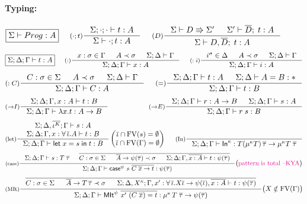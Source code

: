 \begin{figure}
\begin{framed}
\paragraph{Typing:}
\[ \fbox{$\Sigma |- Prog : A$}
 ~~~~
   \inference[($\cdot;t$)]{\Sigma;\cdot;\cdot |- t:A}
                          {\Sigma |- \cdot;t : A}
 ~~~~
   \inference[($D$)]{ \Sigma |- D \Rrightarrow \Sigma'
                    & \Sigma' |- \overline{D};\; t : A}
                    {\Sigma |- D,\overline{D};\; t : A}
\]
\[ \fbox{$\Sigma;\Delta;\Gamma |- t : A$}
 ~~~~
   \inference[($:$)]
      {x:\sigma \in \Gamma & A\prec\sigma & \Sigma;\Delta |- \Gamma} 
      {\Sigma;\Delta;\Gamma |- x:A}
 ~~~~
   \inference[($:i$)]
      {i^\sigma \in \Delta & A\prec\sigma & \Sigma;\Delta |- \Gamma} 
      {\Sigma;\Delta;\Gamma |- i:A}
\]
\[ \inference[($:C$)]
      {C:\sigma \in \Sigma & A\prec\sigma & \Sigma;\Delta |- \Gamma}
      {\Sigma;\Delta;\Gamma |- C:A}
 ~~~~
   \inference[($=$)]{\Sigma;\Delta;\Gamma |- t : A & \Sigma;\Delta |- A = B : *}
                    {\Sigma;\Delta;\Gamma |- t : B}
\]
\[ \inference[($->$$I$)]{\Sigma;\Delta;\Gamma,x:A |- t : B}
                        {\Sigma;\Delta;\Gamma |- \lambda x.t : A -> B}
 ~~~~ ~~~~ ~~~~ ~~~~
   \inference[($->$$E$)]{ \Sigma;\Delta;\Gamma |- r : A -> B
                        & \Sigma;\Delta;\Gamma |- s : A}
                        {\Sigma;\Delta;\Gamma |- r\;s : B}
\]
\[ \inference[(let)]
      { \Sigma;\Delta,\overline{\iota^K};\Gamma |- s : A \\
        \Sigma;\Delta;\Gamma,x:\forall\,\overline{\iota}.A |- t : B }
      {\Sigma;\Delta;\Gamma |- \Let{x}{s}{t} : B }
      \begin{pmatrix} \overline{\iota} \cap \FV(s) = \emptyset \\
                      \overline{\iota} \cap \FV(\Gamma) = \emptyset
      \end{pmatrix}
 ~~~~
   \inference[(In)]
      {}
      {\Sigma;\Delta;\Gamma |- \In^\kappa
        : T(\mu^\kappa T)\,\overline{\tau} -> \mu^\kappa T\; \overline{\tau} }
\]
\[ \inference[(case)]
      { \Sigma;\Delta;\Gamma |- s : T\;\overline\tau
      & \overline{\begin{matrix}
          C:\sigma \in \Sigma ~&~
          \overline{A} -> \psi(\overline{\tau}) \prec \sigma ~&~
          \Sigma;\Delta;\Gamma,\overline{x:A} |- t : \psi(\overline\tau) 
        \end{matrix} }
      }
      {\Sigma;\Delta;\Gamma |- \case^\psi~s~\overline{C\;\overline{x} -> t}
                             : \psi(\overline\tau) }
      \big( \text{\KYA{pattern is total}} \big)
\]
\[ \inference[(MIt)]
      { \overline{\begin{matrix}
        C:\sigma\in\Sigma ~&~ \overline{A} -> T\,\overline\tau \prec \sigma
      ~&~
        \Sigma;\Delta,X^{\kappa};
        \Gamma
            ,x':\forall\,\overline\iota.X\overline\iota -> \psi(\overline\iota)
            ,\overline{x:A}
          |- t : \psi(\overline\tau) \end{matrix} }
      }
      {\Sigma;\Delta;\Gamma
           |- \MIt^\psi ~ \overline{x' ~ (C\;\overline{x}) = t}
            : \mu^{\kappa}\,T\;\overline\tau -> \psi(\overline\tau) }
      \big( X\notin\FV(\Gamma) \big)
\]


\end{framed}
\end{figure}

